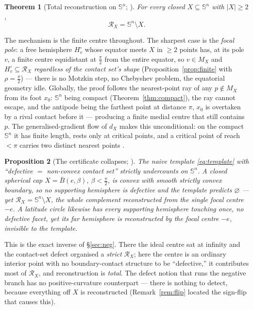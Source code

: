 \documentclass[11pt]{article}
\newtheorem{theorem}{Theorem}[section]
\newtheorem{proposition}[theorem]{Proposition}
\theoremstyle{remark}
\newcommand{\X}{X}
\newcommand{\Mx}{M_{\X}}
\newcommand{\Rx}{\mathcal{R}_{\X}}
\newcommand{\Sn}{\mathbb{S}^{n}}
\begin{document}
\begin{theorem}[Total reconstruction on $\Sn$; {\cite[Thm.~4.1]{Sph}}]
\label{thm:sph}
For every closed $\X\subseteq\Sn$ with $|\X|\ge2$,
\[
  \Rx=\Sn\setminus\X .
\]
\end{theorem}

The mechanism is the finite centre throughout. The sharpest case is the
\emph{focal pole}: a free hemisphere $H_{v}^{\circ}$ whose equator meets
$\X$ in $\ge2$ points has, at its pole $v$, a finite centre equidistant at
$\tfrac\pi2$ from the entire equator, so $v\in\Mx$ and $H_{v}^{\circ}
\subseteq\Rx$ \emph{regardless of the contact set's shape}
(Proposition~\ref{prop:finite} with $\rho=\tfrac\pi2$) --- there is no
Motzkin step, no Chebyshev problem, the equatorial geometry idle. Globally,
the proof follows the nearest-point ray of any $p\notin\Mx$ from its foot
$x_{0}$: $\Sn$ being compact (Theorem~\ref{thm:compact}), the ray cannot
escape, and the antipode being the farthest point at distance $\pi$,
$x_{0}$ is overtaken by a rival contact before it --- producing a finite
medial centre that still contains $p$. The
generalised-gradient flow of $d_{\X}$ \cite{Lie,ACa} makes this
unconditional: on the compact $\Sn$ it has finite length, rests only at
critical points, and a critical point of reach $<\pi$ carries two distinct
nearest points \cite[Thm.~4.1, Step~3]{Sph}.

\begin{proposition}[The certificate collapses; {\cite[Prop.~5.1--5.2]{Sph}}]
\label{prop:collapse}
The naive template \eqref{eq:template} with ``defective $=$ non-convex
contact set'' strictly undercounts on $\Sn$. A closed spherical cap
$\X=\bar B(e,\beta)$, $\beta<\tfrac\pi2$, is convex with smooth strictly
convex boundary, so no supporting hemisphere is defective and the template
predicts $\varnothing$ --- yet $\Rx=\Sn\setminus\X$, the whole complement
reconstructed from the single focal centre $-e$. A latitude circle
likewise has every supporting hemisphere touching once, no defective
facet, yet its far hemisphere is reconstructed by the focal centre $-e$,
invisible to the template.
\end{proposition}

This is the exact inverse of \S\ref{sec:neg}. There the ideal centre sat at
infinity and the contact-set defect organised a \emph{strict} $\Rx$; here
the centre is an ordinary interior point with no boundary-contact structure
to be ``defective,'' it contributes most of $\Rx$, and reconstruction is
\emph{total}. The defect notion that runs the negative branch has no
positive-curvature counterpart --- there is nothing to detect, because
everything off $\X$ is reconstructed (Remark~\ref{rem:flip} located the
sign-flip that causes this).
\end{document}
